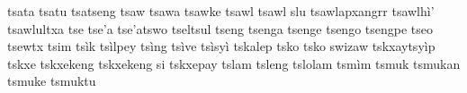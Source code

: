 tsata\hspace{2mm}
tsatu\hspace{2mm}
tsatseng\hspace{2mm}
tsaw\hspace{2mm}
tsawa\hspace{2mm}
tsawke\hspace{2mm}
tsawl\hspace{2mm}
tsawl slu\hspace{2mm}
tsawlapxangrr\hspace{2mm}
tsawlhì'\hspace{2mm}
tsawlultxa\hspace{2mm}
tse\hspace{2mm}
tse'a\hspace{2mm}
tse'atswo\hspace{2mm}
tseltsul\hspace{2mm}
tseng\hspace{2mm}
tsenga\hspace{2mm}
tsenge\hspace{2mm}
tsengo\hspace{2mm}
tsengpe\hspace{2mm}
tseo\hspace{2mm}
tsewtx\hspace{2mm}
tsim\hspace{2mm}
tsìk\hspace{2mm}
tsìlpey\hspace{2mm}
tsìng\hspace{2mm}
tsìve\hspace{2mm}
tsìsyì\hspace{2mm}
tskalep\hspace{2mm}
tsko\hspace{2mm}
tsko swizaw\hspace{2mm}
tskxaytsyìp\hspace{2mm}
tskxe\hspace{2mm}
tskxekeng\hspace{2mm}
tskxekeng si\hspace{2mm}
tskxepay\hspace{2mm}
tslam\hspace{2mm}
tsleng\hspace{2mm}
tslolam\hspace{2mm}
tsmìm\hspace{2mm}
tsmuk\hspace{2mm}
tsmukan\hspace{2mm}
tsmuke\hspace{2mm}
tsmuktu\hspace{2mm}
